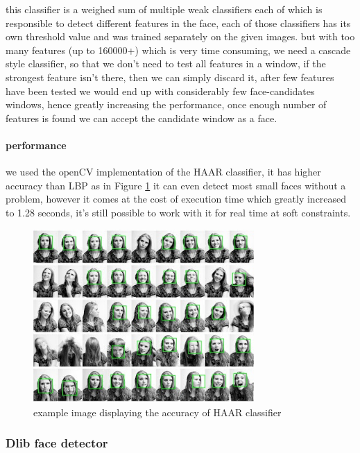 this classifier is a weighed sum of multiple weak classifiers each of which is responsible to detect different features in the face, each of those classifiers has its own threshold value and was trained separately on the given images.
but with too many features (up to 160000+) which is very time consuming, we need a cascade style classifier, so that we don't need to test all features in a window, if the strongest feature isn't there, then we can simply discard it, after few features have been tested we would end up with considerably few face-candidates windows, hence greatly increasing the performance, once enough number of features is found we can accept the candidate window as a face.

\paragraph{performance}
we used the openCV implementation of the HAAR classifier, it has higher accuracy than LBP as in Figure \ref{fig:haar_example} it can even detect most small faces without a problem, however it comes at the cost of execution time which greatly increased to 1.28 seconds, it's still possible to work with it for real time at soft constraints.
\begin{figure}
	\centering
	\includegraphics[width=0.75\textwidth]{images/haar_example.jpg}
	\caption{example image displaying the accuracy of HAAR classifier}
	\label{fig:haar_example}
\end{figure}


\subsubsection{Dlib face detector}
